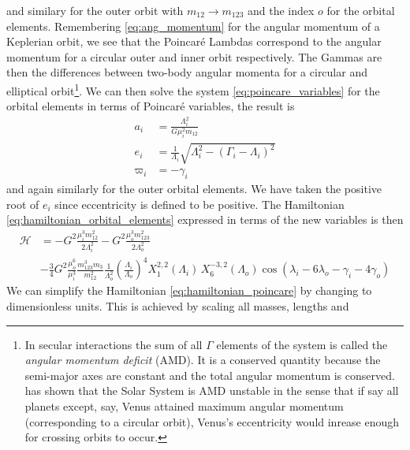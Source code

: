 \documentclass[ twoside,openright,titlepage,numbers=noenddot,headinclude,%
                footinclude=true,cleardoublepage=empty,abstractoff, %
                BCOR=5mm,paper=a4,fontsize=11pt,%
                american,%
                ]{scrreprt}
\begin{document}
and similary for the outer orbit with $m_{12}\rightarrow m_{123}$ and the
index $o$ for the orbital elements. Remembering \cref{eq:ang_momentum} for 
the angular momentum of a Keplerian orbit, we see that the Poincaré 
Lambdas correspond to the angular momentum for a circular outer and inner orbit
respectively. The Gammas are then the differences between two-body angular
momenta for a circular and elliptical orbit\footnote{In secular interactions
the sum of all $\Gamma$ elements of the system
is called the \emph{angular momentum deficit} (AMD). It is a conserved quantity
because the semi-major axes are constant and the total angular momentum is conserved.
\cite{laskar} has shown that the Solar System is AMD unstable in the sense that
if say all planets except, say, Venus attained maximum angular momentum (corresponding
to a circular orbit), Venus's eccentricity would inrease enough for crossing
orbits to occur.}.
We can then solve the system 
\ref{eq:poincare_variables} for the orbital elements in terms of Poincaré
variables, the result is
\begin{equation}
    \begin{aligned}
        a_i&= \frac{\Lambda_i^2}{G\mu_i^2m_{12}} \\
        e_i &= \frac{1}{\Lambda_i} \sqrt{\Lambda_i^2-(\Gamma_i-\Lambda_i)^2}\\
        \varpi_i&=-\gamma_i
    \end{aligned}
    \label{eq:orbital_elems_in_terms_of_poincare}
\end{equation}
and again similarly for the outer orbital elements. We have taken the positive root
of $e_i$ since eccentricity is defined to be positive. The Hamiltonian
\ref{eq:hamiltonian_orbital_elements} expressed in terms of the new variables
is then
\begin{equation}
    \begin{aligned}
        \mathcal{H}&=-G^2 \frac{\mu_i^3m_{12}^2}{2\Lambda_i^2}  
        -G^2 \frac{\mu_o^3m_{123}^2}{2\Lambda_o^2}\\ 
        &-\frac{3}{4}G^2 \frac{\mu_o^6}{\mu_i^3} \frac{m_{123}^3m_3}{m_{12}^2}
        \frac{1}{\Lambda_o^2} \left(\frac{\Lambda_i}{\Lambda_o}\right)^4
    X^{2,2}_1(\Lambda_i)\,X^{-3,2}_6(\Lambda_o)\cos(\lambda_i-6\lambda_o
    -\gamma_i - 4\gamma_o)
    \end{aligned}
    \label{eq:hamiltonian_poincare}
\end{equation}
We can simplify the Hamiltonian \ref{eq:hamiltonian_poincare} by changing
to dimensionless units. This is achieved by scaling all masses, lengths and
\end{document}
